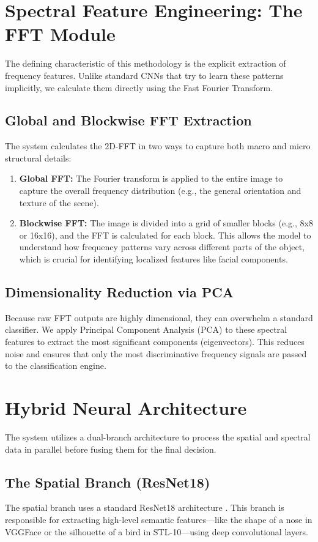 \section{Spectral Feature Engineering: The FFT Module}

The defining characteristic of this methodology is the explicit extraction of frequency features. Unlike standard CNNs that try to learn these patterns implicitly, we calculate them directly using the Fast Fourier Transform.

\subsection{Global and Blockwise FFT Extraction}
The system calculates the 2D-FFT in two ways to capture both macro and micro structural details:
\begin{enumerate}
    \item \textbf{Global FFT:} The Fourier transform is applied to the entire image to capture the overall frequency distribution (e.g., the general orientation and texture of the scene).
    \item \textbf{Blockwise FFT:} The image is divided into a grid of smaller blocks (e.g., 8x8 or 16x16), and the FFT is calculated for each block. This allows the model to understand how frequency patterns vary across different parts of the object, which is crucial for identifying localized features like facial components.
\end{enumerate}

\subsection{Dimensionality Reduction via PCA}
Because raw FFT outputs are highly dimensional, they can overwhelm a standard classifier. We apply Principal Component Analysis (PCA) to these spectral features to extract the most significant components (eigenvectors). This reduces noise and ensures that only the most discriminative frequency signals are passed to the classification engine.

\section{Hybrid Neural Architecture}

The system utilizes a dual-branch architecture to process the spatial and spectral data in parallel before fusing them for the final decision.

\subsection{The Spatial Branch (ResNet18)}
The spatial branch uses a standard ResNet18 architecture \cite{resnet}. This branch is responsible for extracting high-level semantic features—like the shape of a nose in VGGFace or the silhouette of a bird in STL-10—using deep convolutional layers.

